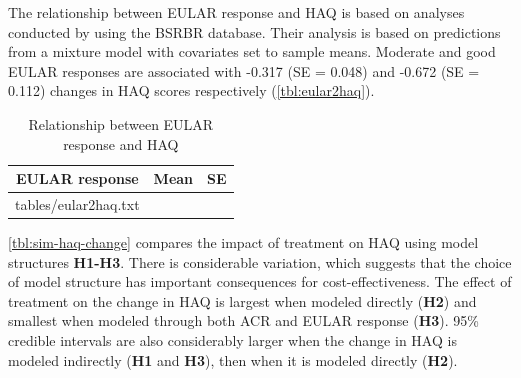 \documentclass[11pt,final,fleqn]{article}\usepackage[]{graphicx}\usepackage[]{color}
\makeatletter
\theoremstyle{plain}
\newcommand*\ExpandableInput[1]{\@@input#1 }
\makeatother
\begin{document}
The relationship between EULAR response and HAQ is based on analyses conducted by \citet{stevenson2016adalimumab} using the BSRBR database. Their analysis is based on predictions from a mixture model with covariates set to sample means. Moderate and good EULAR responses are associated with -0.317 (SE = 0.048) and -0.672 (SE = 0.112) changes in HAQ scores respectively (\autoref{tbl:eular2haq}). 

\begin{table}[!ht]
\begin{center}
\begin{threeparttable}
\caption{Relationship between EULAR response and HAQ} \label{tbl:eular2haq}
\begin{tabularx}{\textwidth}{@{\extracolsep{\fill}}lcc}
\hline
\multicolumn{1}{c}{EULAR response} & \multicolumn{1}{c}{Mean} & \multicolumn{1}{c}{SE} \\
\hline
\ExpandableInput{tables/eular2haq.txt}
\hline
\end{tabularx}
\scriptsize
\end{threeparttable}
\end{center}
\end{table}

\autoref{tbl:sim-haq-change} compares the impact of treatment on HAQ using model structures \textbf{H1-H3}. There is considerable variation, which suggests that the choice of model structure has important consequences for cost-effectiveness. The effect of treatment on the change in HAQ is largest when modeled directly (\textbf{H2}) and smallest when modeled through both ACR and EULAR response (\textbf{H3}). 95\% credible intervals are also considerably larger when the change in HAQ is modeled indirectly (\textbf{H1} and \textbf{H3}), then when it is modeled directly (\textbf{H2}). 
\end{document}
